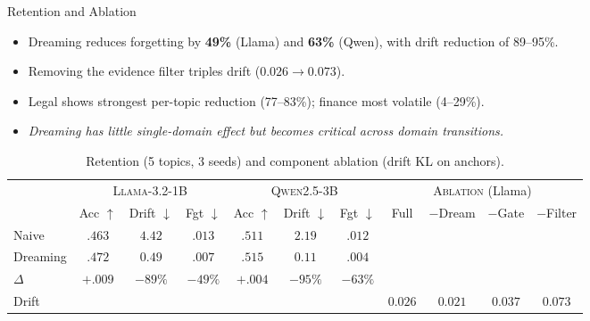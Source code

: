   \begin{block}{Retention and Ablation}

    \begin{itemize}\setlength{\itemsep}{2pt}
        \item Dreaming reduces forgetting by \textcolor{cardinal}{\textbf{49\%}} (Llama) and \textcolor{cardinal}{\textbf{63\%}} (Qwen), with drift reduction of 89--95\%.
        \item Removing the evidence filter triples drift ($0.026 \to 0.073$).
        \item Legal shows strongest per-topic reduction (77--83\%); finance most volatile (4--29\%).
        \item \textcolor{cardinal}{\emph{Dreaming has little single-domain effect but becomes critical across domain transitions.}}
    \end{itemize}

    \begin{table}
    \small
    \centering
    \begin{tabular}{@{}lcccccccccc@{}}
    \toprule
    & \multicolumn{3}{c}{\textsc{Llama-3.2-1B}} & \multicolumn{3}{c}{\textsc{Qwen2.5-3B}} & \multicolumn{4}{c}{\textsc{Ablation} (Llama)} \\
    \cmidrule(lr){2-4} \cmidrule(lr){5-7} \cmidrule(lr){8-11}
    & Acc $\uparrow$ & Drift $\downarrow$ & Fgt $\downarrow$
    & Acc $\uparrow$ & Drift $\downarrow$ & Fgt $\downarrow$
    & Full & $-$Dream & $-$Gate & $-$Filter \\
    \midrule
    Naive & $.463$ & $4.42$ & $.013$ & $.511$ & $2.19$ & $.012$ & \multicolumn{4}{c}{} \\
    Dreaming & $.472$ & $0.49$ & $.007$ & $.515$ & $0.11$ & $.004$ & \multicolumn{4}{c}{} \\
    $\Delta$ & $+.009$ & \textcolor{cardinal}{\textbf{$-89\%$}} & \textcolor{cardinal}{\textbf{$-49\%$}} & $+.004$ & \textcolor{cardinal}{\textbf{$-95\%$}} & \textcolor{cardinal}{\textbf{$-63\%$}} & \multicolumn{4}{c}{} \\
    \midrule
    Drift & \multicolumn{3}{c}{} & \multicolumn{3}{c}{} & $0.026$ & $0.021$ & $0.037$ & $0.073$ \\
    \bottomrule
    \end{tabular}
    \caption{Retention (5 topics, 3 seeds) and component ablation (drift KL on anchors).}
    \label{tab:retention}
    \end{table}

  \end{block}
